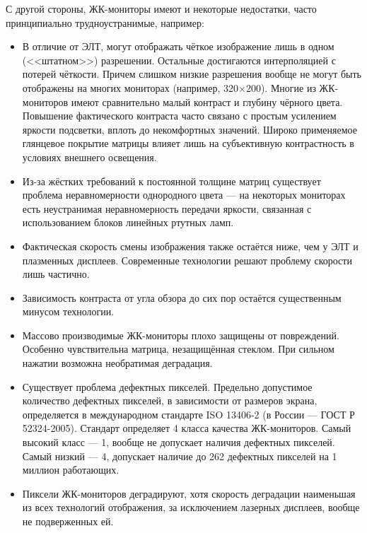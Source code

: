 \begin{itemize}
  С другой стороны, ЖК-мониторы имеют и некоторые недостатки, часто принципиально трудноустранимые, например:
  \begin{itemize}
   \item В отличие от ЭЛТ, могут отображать чёткое изображение лишь в одном (<<штатном>>) разрешении.
    Остальные достигаются интерполяцией с потерей чёткости.
    Причем слишком низкие разрешения вообще не могут быть отображены на многих мониторах (например, 320×200).
    Многие из ЖК-мо\-ни\-то\-ров имеют сравнительно малый контраст и глубину чёрного цвета.
    Повышение фактического контраста часто связано с простым усилением яркости подсветки, вплоть до некомфортных значений.
    Широко применяемое глянцевое покрытие матрицы влияет лишь на субъективную контрастность в условиях внешнего освещения.
   \item Из-за жёстких требований к постоянной толщине матриц существует проблема неравномерности однородного цвета --- на некоторых мониторах есть неустранимая неравномерность передачи яркости, связанная с использованием блоков линейных ртутных ламп.
   \item Фактическая скорость смены изображения также остаётся ниже, чем у ЭЛТ и плазменных дисплеев.
    Современные технологии решают проблему скорости лишь частично.
   \item Зависимость контраста от угла обзора до сих пор остаётся существенным минусом технологии.
   \item Массово производимые ЖК-мониторы плохо защищены от повреждений.
    Особенно чувствительна матрица, незащищённая стеклом.
    При сильном нажатии возможна необратимая деградация.
   \item Существует проблема дефектных пикселей.
   Предельно допустимое количество дефектных пикселей, в зависимости от размеров экрана, определяется в международном стандарте ISO 13406-2 (в России --- ГОСТ Р 52324-2005).
   Стандарт определяет 4 класса качества ЖК-мониторов.
   Самый высокий класс --- 1, вообще не допускает наличия дефектных пикселей.
   Самый низкий --- 4, допускает наличие до 262 дефектных пикселей на 1 миллион работающих.
   \item Пиксели ЖК-мониторов деградируют, хотя скорость деградации наименьшая из всех технологий отображения, за исключением лазерных дисплеев, вообще не подверженных ей.
  \end{itemize}
\end{itemize}


